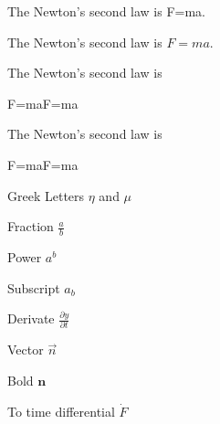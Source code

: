 \documentclass{article}
\begin{document}
 
   The Newton's second law is F=ma. 

   The Newton's second law is $F=ma$. 

   The Newton's second law is 
  

F=maF=ma



   The Newton's second law is 
  

F=maF=ma



   Greek Letters $\eta$ and $\mu$ 

   Fraction $\frac{a}{b}$ 

   Power $a^b$ 

   Subscript $a_b$ 

   Derivate $\frac{\partial y}{\partial t} $ 

   Vector $\vec{n}$ 

   Bold $\mathbf{n}$ 

   To time differential $\dot{F}$ 
\end{document}
